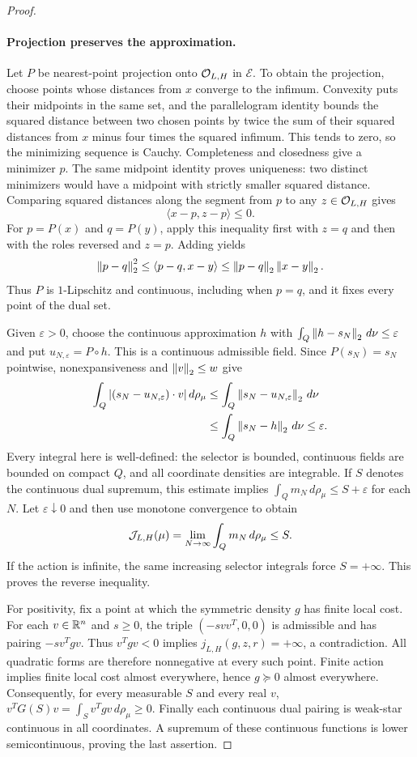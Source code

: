 \begin{proof}
\paragraph{Projection preserves the approximation.}
Let $P$ be nearest-point projection onto $\mathcal O_{L,H}$ in $\mathcal E$.
To obtain the projection, choose points whose distances from $x$ converge
to the infimum. Convexity puts their midpoints in the same set, and the
parallelogram identity bounds the squared distance between two chosen
points by twice the sum of their squared distances from $x$ minus four
times the squared infimum. This tends to zero, so the minimizing sequence
is Cauchy. Completeness and closedness give a minimizer $p$.
The same midpoint identity proves uniqueness: two distinct minimizers
would have a midpoint with strictly smaller squared distance. Comparing squared distances
along the segment from $p$ to any $z\in\mathcal O_{L,H}$ gives
\[
 \langle x-p,z-p\rangle\le0.
\]
For $p=P(x)$ and $q=P(y)$, apply this inequality first with $z=q$ and
then with the roles reversed and $z=p$. Adding yields
\[
 \left\lVert p-q\right\rVert_2^2\le\langle p-q,x-y\rangle
                   \le\left\lVert p-q\right\rVert_2\left\lVert x-y\right\rVert_2.
\]
Thus $P$ is $1$-Lipschitz and continuous, including when $p=q$, and it
fixes every point of the dual set.

Given $\varepsilon>0$, choose the continuous approximation $h$ with
$\int_Q\left\lVert h-s_N\right\rVert_2\,d\nu\le\varepsilon$ and put
$u_{N,\varepsilon}=P\circ h$. This is a continuous admissible field.
Since $P(s_N)=s_N$ pointwise, nonexpansiveness and $\left\lVert v\right\rVert_2\le w$ give
\[
 \begin{aligned}
 \int_Q|(s_N-u_{N,\varepsilon})\cdot v|\,d\rho_\mu
 &\le\int_Q\left\lVert s_N-u_{N,\varepsilon}\right\rVert_2\,d\nu\\
 &\le\int_Q\left\lVert s_N-h\right\rVert_2\,d\nu\le\varepsilon.
 \end{aligned}
\]
Every integral here is well-defined: the selector is bounded, continuous
fields are bounded on compact $Q$, and all coordinate densities are
integrable. If $S$ denotes the continuous dual supremum, this estimate
implies $\int_Qm_N\,d\rho_\mu\le S+\varepsilon$ for each $N$.
Let $\varepsilon\downarrow0$ and then use monotone convergence to obtain
\[
 \mathcal J_{L,H}(\mu)=\lim_{N\to\infty}\int_Qm_N\,d\rho_\mu\le S.
\]
If the action is infinite, the same increasing selector integrals force
$S=+\infty$. This proves the reverse inequality.

For positivity, fix a point at which the symmetric density $g$ has finite
local cost. For each $v\in\mathbb R^n$ and $s\ge0$, the triple $(-svv^T,0,0)$ is
admissible and has pairing $-s v^Tgv$. Thus $v^Tgv<0$ implies
$j_{L,H}(g,z,r)=+\infty$, a contradiction. All quadratic forms are
therefore nonnegative at every such point. Finite action implies finite
local cost almost everywhere, hence $g\succeq0$ almost everywhere.
Consequently, for every measurable $S$ and every
real $v$, $v^TG(S)v=\int_S v^Tgv\,d\rho_\mu\ge0$.
Finally each continuous dual pairing is weak-star continuous in all
coordinates. A supremum of these continuous functions is lower
semicontinuous, proving the last assertion.
\end{proof}

